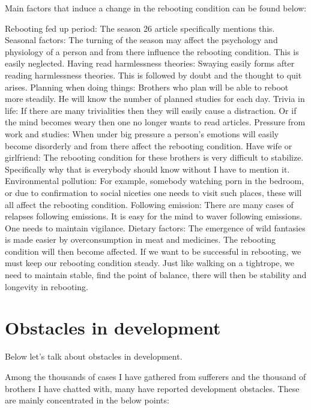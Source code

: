 \documentclass[
]{book}
\begin{document}
Main factors that induce a change in the rebooting condition can be found below:

Rebooting fed up period: The season 26 article specifically mentions this.
Seasonal factors: The turning of the season may affect the psychology and physiology of a person and from there influence the rebooting condition. This is easily neglected.
Having read harmlessness theories: Swaying easily forms after reading harmlessness theories. This is followed by doubt and the thought to quit arises.
Planning when doing things: Brothers who plan will be able to reboot more steadily. He will know the number of planned studies for each day.
Trivia in life: If there are many trivialities then they will easily cause a distraction. Or if the mind becomes weary then one no longer wants to read articles.
Pressure from work and studies: When under big pressure a person's emotions will easily become disorderly and from there affect the rebooting condition.
Have wife or girlfriend: The rebooting condition for these brothers is very difficult to stabilize. Specifically why that is everybody should know without I have to mention it.
Environmental pollution: For example, somebody watching porn in the bedroom, or due to confirmation to social niceties one needs to visit such places, these will all affect the rebooting condition.
Following emission: There are many cases of relapses following emissions. It is easy for the mind to waver following emissions. One needs to maintain vigilance.
Dietary factors: The emergence of wild fantasies is made easier by overconsumption in meat and medicines. The rebooting condition will then become affected.
If we want to be successful in rebooting, we must keep our rebooting condition steady. Just like walking on a tightrope, we need to maintain stable, find the point of balance, there will then be stability and longevity in rebooting.

\hypertarget{obstacles-in-development}{%
\section{Obstacles in development}\label{obstacles-in-development}}

Below let's talk about obstacles in development.

Among the thousands of cases I have gathered from sufferers and the thousand of brothers I have chatted with, many have reported development obstacles. These are mainly concentrated in the below points:
\end{document}
